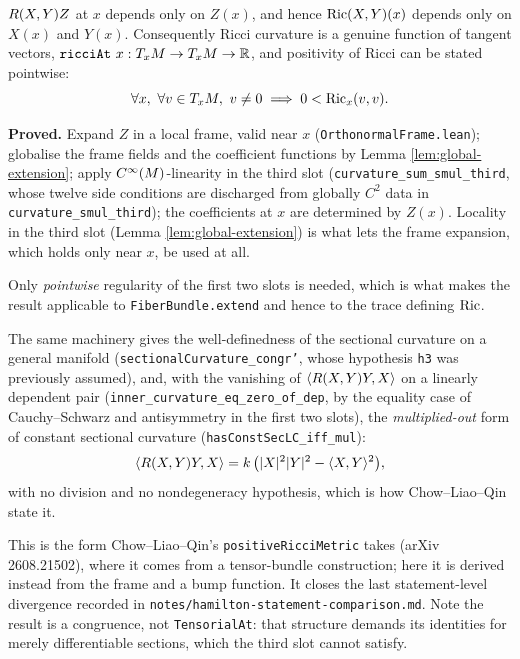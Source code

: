 \begin{lemma}
  \label{lem:curvature-pointwise}
  \leanok
  $R(X,Y)Z$ at $x$ depends only on $Z(x)$, and hence $\operatorname{Ric}(X,Y)(x)$ depends
  only on $X(x)$ and $Y(x)$. Consequently Ricci curvature is a genuine function
  of tangent vectors, $\texttt{ricciAt}\ x : T_xM \to T_xM \to \mathbb{R}$, and
  positivity of Ricci can be stated pointwise:
  \[
    \forall x,\ \forall v \in T_xM,\ v \ne 0 \implies 0 < \operatorname{Ric}_x(v,v).
  \]

  \textbf{Proved.} Expand $Z$ in a local frame, valid near $x$
  (\texttt{OrthonormalFrame.lean}); globalise the frame fields and the
  coefficient functions by Lemma \ref{lem:global-extension}; apply
  $C^\infty(M)$-linearity in the third slot
  (\texttt{curvature\_sum\_smul\_third}, whose twelve side conditions are
  discharged from globally $C^2$ data in \texttt{curvature\_smul\_third}); the
  coefficients at $x$ are determined by $Z(x)$. Locality in the third slot
  (Lemma \ref{lem:global-extension}) is what lets the frame expansion, which
  holds only near $x$, be used at all.

  Only \emph{pointwise} regularity of the first two slots is needed, which is
  what makes the result applicable to \texttt{FiberBundle.extend} and hence to
  the trace defining $\operatorname{Ric}$.

  The same machinery gives the well-definedness of the sectional curvature on a
  general manifold (\texttt{sectionalCurvature\_congr'}, whose hypothesis
  \texttt{h3} was previously assumed), and, with the vanishing of
  $\langle R(X,Y)Y, X\rangle$ on a linearly dependent pair
  (\texttt{inner\_curvature\_eq\_zero\_of\_dep}, by the equality case of
  Cauchy--Schwarz and antisymmetry in the first two slots), the
  \emph{multiplied-out} form of constant sectional curvature
  (\texttt{hasConstSecLC\_iff\_mul}):
  \[
    \langle R(X,Y)Y, X\rangle
      = k\,\bigl(|X|^2|Y|^2 - \langle X,Y\rangle^2\bigr),
  \]
  with no division and no nondegeneracy hypothesis, which is how Chow--Liao--Qin
  state it.

  This is the form Chow--Liao--Qin's \texttt{positiveRicciMetric} takes
  (arXiv 2608.21502), where it comes from a tensor-bundle construction; here it
  is derived instead from the frame and a bump function. It closes the last
  statement-level divergence recorded in
  \texttt{notes/hamilton-statement-comparison.md}. Note the result is a
  congruence, not \texttt{TensorialAt}: that structure demands its identities
  for merely differentiable sections, which the third slot cannot satisfy.
\end{lemma}

